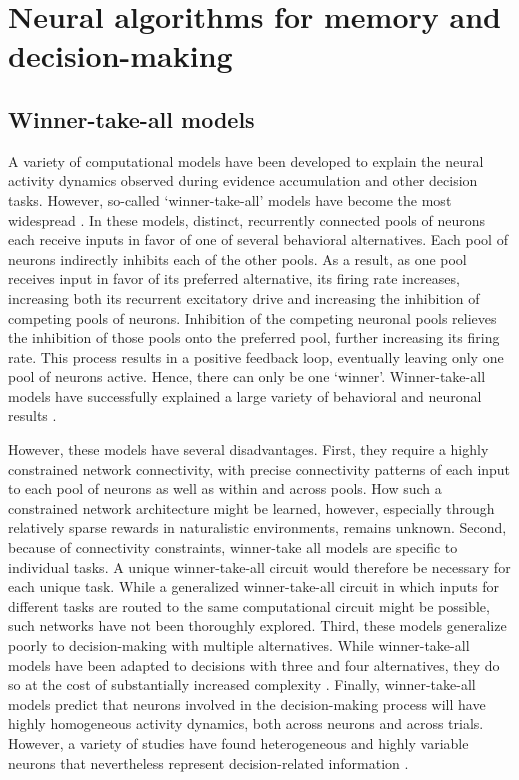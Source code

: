 \section{Neural algorithms for memory and decision-making} \label{intro:neural_models}

\subsection{Winner-take-all models} \label{intro:wta}

A variety of computational models have been developed to explain the neural activity dynamics observed during evidence accumulation and other decision tasks. However, so-called ‘winner-take-all’ models have become the most widespread \citep{Wong:2006in, Wang:2012ed, Machens:2005en, Wang:2002kn}. In these models, distinct, recurrently connected pools of neurons each receive inputs in favor of one of several behavioral alternatives. Each pool of neurons indirectly inhibits each of the other pools. As a result, as one pool receives input in favor of its preferred alternative, its firing rate increases, increasing both its recurrent excitatory drive and increasing the inhibition of competing pools of neurons. Inhibition of the competing neuronal pools relieves the inhibition of those pools onto the preferred pool, further increasing its firing rate. This process results in a positive feedback loop, eventually leaving only one pool of neurons active. Hence, there can only be one ‘winner’. Winner-take-all models have successfully explained a large variety of behavioral and neuronal results \citep{Wang:2008bd}.

\bigskip
However, these models have several disadvantages. First, they require a highly constrained network connectivity, with precise connectivity patterns of each input to each pool of neurons as well as within and across pools. How such a constrained network architecture might be learned, however, especially through relatively sparse rewards in naturalistic environments, remains unknown. Second, because of connectivity constraints, winner-take all models are specific to individual tasks. A unique winner-take-all circuit would therefore be necessary for each unique task. While a generalized winner-take-all circuit in which inputs for different tasks are routed to the same computational circuit might be possible, such networks have not been thoroughly explored. Third, these models generalize poorly to decision-making with multiple alternatives. While winner-take-all models have been adapted to decisions with three and four alternatives, they do so at the cost of substantially increased complexity \citep{Churchland:2008ds, Churchland:2012fb, Niwa:2008in}. Finally, winner-take-all models predict that neurons involved in the decision-making process will have highly homogeneous activity dynamics, both across neurons and across trials. However, a variety of studies have found heterogeneous and highly variable neurons that nevertheless represent decision-related information \citep{Meister:2013ca, Park:2014co, Jun:2010kj, Raposo:2014df, Mante:2013ie, Rigotti:2013bo}. 

